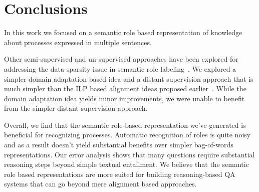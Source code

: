 \section{Conclusions}
In this work we focused on a semantic role based representation of knowledge about processes expressed in multiple sentences.

Other semi-supervised and un-supervised approaches have been explored for addressing the data sparsity issue in semantic role labeling~\cite{furstenau-emnlp2009,lang-emnlp2011,lang-naacl2010}. We explored a simpler domain adaptation based idea and a distant supervision approach that is much simpler than the ILP based alignment ideas proposed earlier~\cite{furstenau-emnlp2009}. While the domain adaptation idea yields minor improvements, we were unable to benefit from the simpler distant supervision approach.

Overall, we find that the semantic role-based representation we've generated is beneficial for recognizing processes.
Automatic recognition of roles is quite noisy and as a result doesn't yield substantial benefits over simpler bag-of-words representations. 
Our error analysis shows that many questions require substantial reasoning steps beyond simple textual entailment. 
We believe that the semantic role based representations are more suited for building reasoning-based QA systems that can go beyond
mere alignment based approaches.
